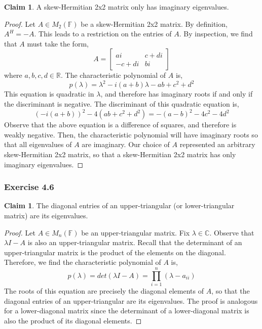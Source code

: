 \documentclass[letterpaper,12pt]{article}
\theoremstyle{definition}
\newtheorem{claim}[theorem]{Claim}
\begin{document}
\begin{claim}
	A skew-Hermitian 2x2 matrix only has imaginary eigenvalues. 
\end{claim}
\begin{proof}
	Let $A \in M_2(\mathbb{F})$ be a skew-Hermitian 2x2 matrix. By definition, $A^H = -A$. This leads to a restriction on the entries of $A$. By inspection, we find that $A$ must take the form,
	\begin{equation}
	A =
	\begin{bmatrix}
	ai & c + di \\
	-c + di & bi
	\end{bmatrix}
	\end{equation}
	where $a, b, c, d \in \mathbb{R}$.	 The characteristic polynomial of $A$ is,
	\begin{equation}
	p(\lambda) = \lambda^2 -i(a+b)\lambda - ab + c^2 + d^2
	\end{equation}
	This equation is quadratic in $\lambda$, and therefore has imaginary roots if and only if the discriminant is negative. The discriminant of this quadratic equation is,
	\begin{equation}
	(-i(a+b))^2 - 4(ab +c^2 + d^2) = -(a-b)^2 -4c^2 - 4d^2
	\end{equation}
	Observe that the above equation is a difference of squares, and therefore is weakly negative. Then, the characteristic polynomial will have imaginary roots so that all eigenvalues of $A$ are imaginary. Our choice of $A$ represented an arbitrary skew-Hermitian 2x2 matrix, so that a skew-Hermitian 2x2 matrix has only imaginary eigenvalues.
\end{proof}

\subsubsection*{Exercise 4.6}
\begin{claim}
	The diagonal entries of an upper-triangular (or lower-triangular matrix) are its eigenvalues.
\end{claim}
\begin{proof}
	Let $A \in M_n(\mathbb{F})$ be an upper-triangular matrix. Fix $\lambda \in \mathbb{C}$. Observe that $\lambda I - A$ is also an upper-triangular matrix. Recall that the determinant of an upper-triangular matrix is the product of the elements on the diagonal. Therefore, we find the characteristic polynomial of $A$ is,
	\begin{equation}
	p(\lambda) = det(\lambda I - A) = \prod_{i=1}^{n} (\lambda - a_{ii})
	\end{equation}
	The roots of this equation are precisely the diagonal elements of $A$, so that the diagonal entries of an upper-triangular are its eigenvalues. The proof is analogous for a lower-diagonal matrix since the determinant of a lower-diagonal matrix is also the product of its diagonal elements. 
\end{proof}
\end{document}
